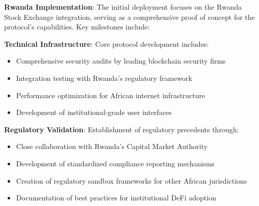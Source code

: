 \documentclass[12pt]{article}
\begin{document}
\textbf{Rwanda Implementation}: The initial deployment focuses on the Rwanda Stock Exchange integration, serving as a comprehensive proof of concept for the protocol's capabilities. Key milestones include:
\textbf{Technical Infrastructure}: Core protocol development includes:
\begin{itemize}
	\item Comprehensive security audits by leading blockchain security firms
	\item Integration testing with Rwanda's regulatory framework
	\item Performance optimization for African internet infrastructure
	\item Development of institutional-grade user interfaces

\end{itemize}
\textbf{Regulatory Validation}: Establishment of regulatory precedents through:
\begin{itemize}
	\item Close collaboration with Rwanda's Capital Market Authority
	\item Development of standardized compliance reporting mechanisms
	\item Creation of regulatory sandbox frameworks for other African jurisdictions
	\item Documentation of best practices for institutional DeFi adoption

\end{itemize}
\end{document}
